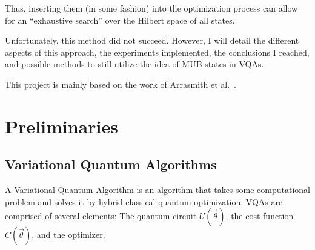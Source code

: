 \documentclass[a4paper,12pt]{article}
\newcommand{\thetas}{\vec{\theta}}
\begin{document}
Thus, inserting them (in some fashion) into the optimization process can allow for an ``exhaustive search'' over the Hilbert space of all states.

Unfortunately, this method did not succeed. However, I will detail the different aspects of this approach, the experiments implemented, the conclusions I reached, and possible methods to still utilize the idea of MUB states in VQAs.

This project is mainly based on the work of Arrasmith et al.~\cite{arrasmith_effect_2021}.


\section{Preliminaries}

\subsection{Variational Quantum Algorithms}
A Variational Quantum Algorithm is an algorithm that takes some computational problem and solves it by hybrid classical-quantum optimization.
VQAs are comprised of several elements: The quantum circuit $U(\thetas)$, the cost function $C(\thetas)$, and the optimizer.
\end{document}
